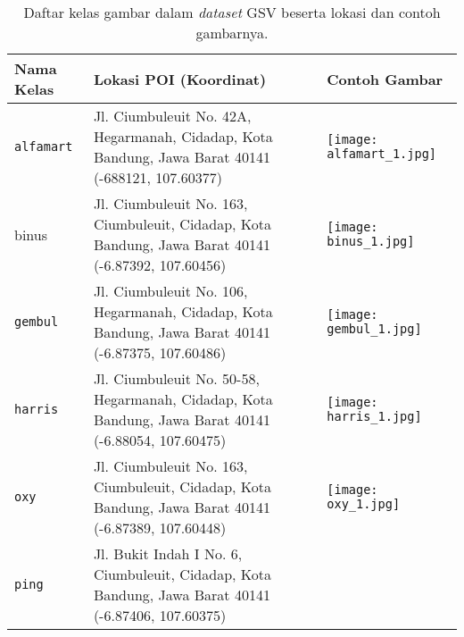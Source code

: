 \begin{longtable}{|p{}|p{}|p{}|}
	\caption{Daftar kelas gambar dalam \textit{dataset} GSV beserta lokasi dan contoh gambarnya.}
	\label{tab:contoh_dataset_gsv} \\
	\hline
	\textbf{Nama Kelas} & \textbf{Lokasi POI (Koordinat)} & \textbf{Contoh Gambar} \\
	\hline
	\texttt{alfamart} & Jl. Ciumbuleuit No. 42A, Hegarmanah, Cidadap, Kota Bandung, Jawa Barat 40141 (-688121, 107.60377) & \begin{minipage}{.4\textwidth}
		\vspace{5pt} \texttt{[image: alfamart\_1.jpg]}
	\end{minipage} \\
	\hline
	binus & Jl. Ciumbuleuit No. 163, Ciumbuleuit, Cidadap, Kota Bandung, Jawa Barat 40141 (-6.87392, 107.60456) & \begin{minipage}{.4\textwidth}
		\vspace{5pt} \texttt{[image: binus\_1.jpg]}
	\end{minipage} \\
	\hline
	\texttt{gembul} & Jl. Ciumbuleuit No. 106, Hegarmanah, Cidadap, Kota Bandung, Jawa Barat 40141 (-6.87375, 107.60486) & \begin{minipage}{.4\textwidth}
		\vspace{5pt} \texttt{[image: gembul\_1.jpg]}
	\end{minipage} \\
	\hline
	\texttt{harris} & Jl. Ciumbuleuit No. 50-58, Hegarmanah, Cidadap, Kota Bandung, Jawa Barat 40141 (-6.88054, 107.60475) & \begin{minipage}{.4\textwidth}
		\vspace{5pt} \texttt{[image: harris\_1.jpg]}
	\end{minipage} \\
	\hline
	\texttt{oxy} & Jl. Ciumbuleuit No. 163, Ciumbuleuit, Cidadap, Kota Bandung, Jawa Barat 40141 (-6.87389, 107.60448) & \begin{minipage}{.4\textwidth}
		\vspace{5pt} \texttt{[image: oxy\_1.jpg]}
	\end{minipage} \\
	\hline
	\texttt{ping} & Jl. Bukit Indah I No. 6, Ciumbuleuit, Cidadap, Kota Bandung, Jawa Barat 40141 (-6.87406, 107.60375) & \begin{minipage}{.4\textwidth}

\end{minipage}
\end{longtable}
